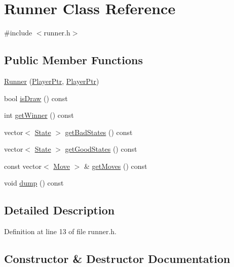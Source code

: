 \hypertarget{class_runner}{}\section{Runner Class Reference}
\label{class_runner}


{\ttfamily \#include $<$runner.\+h$>$}

\subsection*{Public Member Functions}
\begin{DoxyCompactItemize}
\item 
\hyperlink{class_runner_a4bcd8507e4e2e5a1f06d056bd5170144}{Runner} (\hyperlink{runner_8h_afe5d34ded509e15b538d78ebe5cb3db6}{Player\+Ptr}, \hyperlink{runner_8h_afe5d34ded509e15b538d78ebe5cb3db6}{Player\+Ptr})
\item 
bool \hyperlink{class_runner_aa3c82c871ab414550822f993efad22a5}{is\+Draw} () const
\item 
int \hyperlink{class_runner_aa4e55d3ecb77ffc83dfde5dc1fc3663b}{get\+Winner} () const
\item 
vector$<$ \hyperlink{constants_8h_afd2599a4148deb913a46b4e2eba9e68a}{State} $>$ \hyperlink{class_runner_ae3105a026f21ed05a8c022857cd12617}{get\+Bad\+States} () const
\item 
vector$<$ \hyperlink{constants_8h_afd2599a4148deb913a46b4e2eba9e68a}{State} $>$ \hyperlink{class_runner_a2d1297463b5825f5afa1e3e502919698}{get\+Good\+States} () const
\item 
const vector$<$ \hyperlink{struct_move}{Move} $>$ \& \hyperlink{class_runner_aebd1690762a996fbad5aa1b56d3aacc0}{get\+Moves} () const
\item 
void \hyperlink{class_runner_a4cc0bf3493f80516761032d55cc2ffab}{dump} () const
\end{DoxyCompactItemize}


\subsection{Detailed Description}


Definition at line 13 of file runner.\+h.



\subsection{Constructor \& Destructor Documentation}
\mbox{\label{class_runner_a4bcd8507e4e2e5a1f06d056bd5170144}} 
